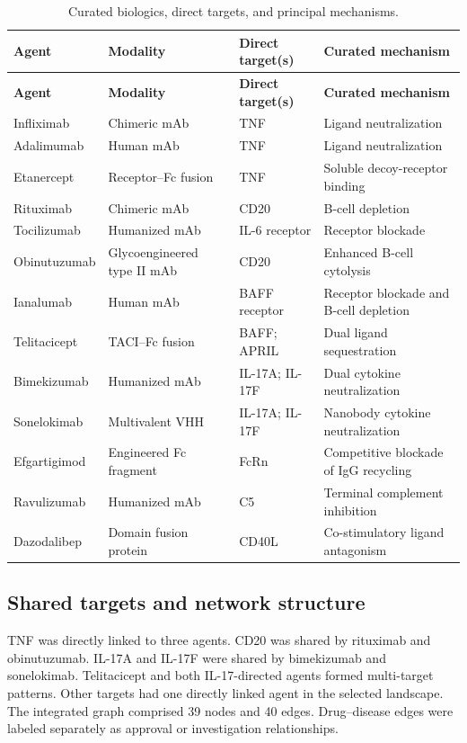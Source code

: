 \documentclass[12pt,a4paper]{article}
\begin{document}
\begin{longtable}{p{}p{}p{}p{}}
\caption{Curated biologics, direct targets, and principal mechanisms.}\label{tab:agents}\\\toprule
\textbf{Agent} & \textbf{Modality} & \textbf{Direct target(s)} & \textbf{Curated mechanism} \\\midrule\endfirsthead
\toprule\textbf{Agent} & \textbf{Modality} & \textbf{Direct target(s)} & \textbf{Curated mechanism} \\\midrule\endhead
Infliximab & Chimeric mAb & TNF & Ligand neutralization \\
Adalimumab & Human mAb & TNF & Ligand neutralization \\
Etanercept & Receptor--Fc fusion & TNF & Soluble decoy-receptor binding \\
Rituximab & Chimeric mAb & CD20 & B-cell depletion \\
Tocilizumab & Humanized mAb & IL-6 receptor & Receptor blockade \\
Obinutuzumab & Glycoengineered type II mAb & CD20 & Enhanced B-cell cytolysis \\
Ianalumab & Human mAb & BAFF receptor & Receptor blockade and B-cell depletion \\
Telitacicept & TACI--Fc fusion & BAFF; APRIL & Dual ligand sequestration \\
Bimekizumab & Humanized mAb & IL-17A; IL-17F & Dual cytokine neutralization \\
Sonelokimab & Multivalent VHH & IL-17A; IL-17F & Nanobody cytokine neutralization \\
Efgartigimod & Engineered Fc fragment & FcRn & Competitive blockade of IgG recycling \\
Ravulizumab & Humanized mAb & C5 & Terminal complement inhibition \\
Dazodalibep & Domain fusion protein & CD40L & Co-stimulatory ligand antagonism \\\bottomrule
\end{longtable}

\subsection{Shared targets and network structure}
TNF was directly linked to three agents. CD20 was shared by rituximab and obinutuzumab. IL-17A and IL-17F were shared by bimekizumab and sonelokimab. Telitacicept and both IL-17-directed agents formed multi-target patterns. Other targets had one directly linked agent in the selected landscape. The integrated graph comprised 39 nodes and 40 edges. Drug--disease edges were labeled separately as approval or investigation relationships.
\end{document}
